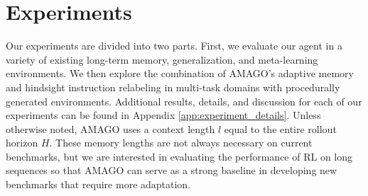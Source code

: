 \documentclass{article}
\begin{document}
\section{Experiments}
\vspace{-3mm}
Our experiments are divided into two parts. First, we evaluate our agent in a variety of existing long-term memory, generalization, and meta-learning environments. We then explore the combination of AMAGO's adaptive memory and hindsight instruction relabeling in multi-task domains with procedurally generated environments. Additional results, details, and discussion for each of our experiments can be found in Appendix \ref{app:experiment_details}. Unless otherwise noted, AMAGO uses a context length $l$ equal to the entire rollout horizon $H$. These memory lengths are not always necessary on current benchmarks, but we are interested in evaluating the performance of RL on long sequences so that AMAGO can serve as a strong baseline in developing new benchmarks that require more adaptation.
\end{document}
